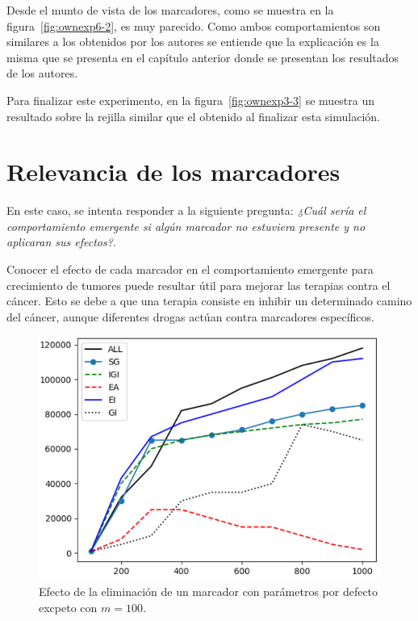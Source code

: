 Desde el munto de vista de los marcadores, como se muestra en la figura~\ref{fig:ownexp6-2}, es muy
parecido. Como ambos comportamientos son similares a los obtenidos por los autores se entiende
que la explicación es la misma que se presenta en el capítulo anterior donde
se presentan los resultados de los autores.

Para finalizar este experimento, en la figura~\ref{fig:ownexp3-3} se muestra un resultado sobre la rejilla similar que el
obtenido al finalizar esta simulación.

\clearpage

\section{Relevancia de los marcadores}

En este caso, se intenta responder a la siguiente pregunta: \textit{¿Cuál sería
el comportamiento emergente si algún marcador no estuviera presente y no aplicaran
sus efectos?}.

Conocer el efecto de cada marcador en el comportamiento emergente para crecimiento de tumores
puede resultar útil para mejorar las terapias contra el cáncer. Esto se debe a que una terapia
consiste en inhibir un determinado camino del cáncer, aunque diferentes drogas actúan contra marcadores específicos.

\begin{figure}[h]
\centering
\includegraphics[scale=0.8]{figures/experiments/exp7/exp7-1}
\caption{Efecto de la eliminación de un marcador con parámetros por defecto excpeto con $m = 100$.}
\label{fig:ownexp7-1}
\end{figure}

